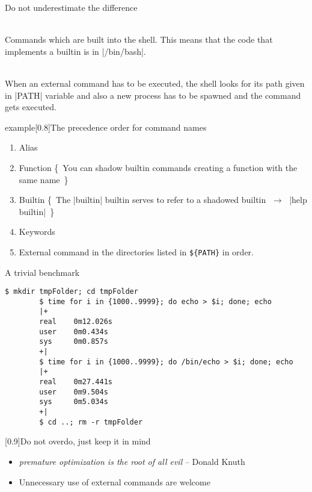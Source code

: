 
\begin{frame}{Do not underestimate the difference}
    \vspace{-3mm}
    \begin{description}[XXX]
        \item[\textbf{Internal Commands:}] ~ \\
            Commands which are built into the shell.
            This means that the code that implements a builtin is in \bash|/bin/bash|.
        \item[\textbf{External Commands:}] ~ \\
            When an external command has to be executed, the shell looks for its path given in \bash|PATH| variable and also a new process has to be spawned and the command gets executed.
    \end{description}
    \begin{varblock}{example}[0.8\textwidth]{The precedence order for command names}
        \begin{enumerate}
            \item Alias
            \item Function {\tiny\{~You can shadow builtin commands creating a function with the same name~\}}
            \item Builtin  {\tiny\{~The \bash|builtin| builtin serves to refer to a shadowed builtin $\;\to\;$ \bash|help builtin|~\}}
            \item Keywords
            \item External command in the directories listed in \texttt{\$\{PATH\}} in order.
        \end{enumerate}
    \end{varblock}
\end{frame}
\begin{frame}[fragile]{A trivial benchmark}
    \begin{lstlisting}[style=MyBash]
        $ mkdir tmpFolder; cd tmpFolder
        $ time for i in {1000..9999}; do echo > $i; done; echo
        |+
        real    0m12.026s
        user    0m0.434s
        sys     0m0.857s
        +|
        $ time for i in {1000..9999}; do /bin/echo > $i; done; echo
        |+
        real    0m27.441s
        user    0m9.504s
        sys     0m5.034s
        +|
        $ cd ..; rm -r tmpFolder
    \end{lstlisting}
    \medskip
    \begin{varblock}{}[0.9\textwidth]{Do not overdo, just keep it in mind}
        \begin{itemize}
            \item \emph{\guillemotleft premature optimization is the root of all evil\guillemotright} -- Donald Knuth
            \item Unnecessary use of external commands are welcome
        \end{itemize}
    \end{varblock}
\end{frame}
